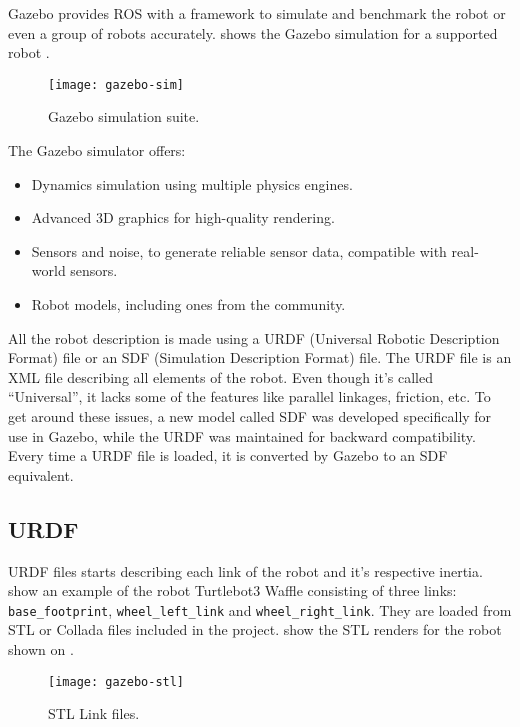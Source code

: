 Gazebo provides ROS with a framework to simulate and benchmark the robot or even a group of robots accurately.  shows the Gazebo simulation for a supported robot \cite{koenig2004design}.

\begin{figure}[!ht]
\centering
\texttt{[image: gazebo-sim]}
\caption{Gazebo simulation suite.}
\label{fig:gazebo-sim}
\end{figure}

The Gazebo simulator offers:

\begin{itemize}
\item Dynamics simulation using multiple physics engines.
\item Advanced 3D graphics for high-quality rendering.
\item Sensors and noise, to generate reliable sensor data, compatible with real-world sensors.
\item Robot models, including ones from the community.
\end{itemize}

All the robot description is made using a URDF (Universal Robotic Description Format) file or an SDF (Simulation Description Format) file. The URDF  file is an XML file describing all elements of the robot. Even though it's called ``Universal'', it lacks some of the features like parallel linkages, friction, etc. To get around these issues, a new model called SDF was developed specifically for use in Gazebo, while the URDF was maintained for backward compatibility. Every time a URDF file is loaded, it is converted by Gazebo to an SDF equivalent.

\subsection{URDF}

URDF files starts describing each link of the robot and it's respective inertia.  show an example of the robot Turtlebot3 Waffle \cite{turtlebot3} consisting of three links: \texttt{base\_footprint}, \texttt{wheel\_left\_link} and \texttt{wheel\_right\_link}. They are loaded from STL or Collada files included in the project.  show the STL renders for the robot shown on .

\begin{figure}[!ht]
\centering
\texttt{[image: gazebo-stl]}
\caption{STL Link files.}
\label{fig:gazebo-stl}
\end{figure}

